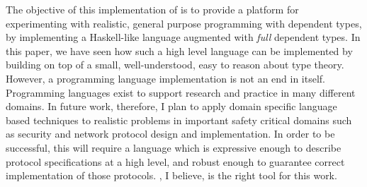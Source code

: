 The objective of this implementation of \Idris{} is to provide a platform
for experimenting with realistic, general purpose programming with dependent
types, by implementing a Haskell-like language augmented with \emph{full}
dependent types. 
In this paper, we have seen how such a high level language can be implemented
by building on top of a small, well-understood, easy to reason about type
theory. 
However, a programming language implementation is not an end in itself. 
Programming languages exist to support research and practice in many different
domains. In future work, therefore, I plan to apply domain specific
language based techniques to realistic problems in important safety critical
domains such as security and network protocol design and implementation. In
order to be successful, this will require a language which is expressive enough
to describe protocol specifications at a high level, and robust enough to
guarantee correct implementation of those protocols. \Idris{}, I believe, is
the right tool for this work.

